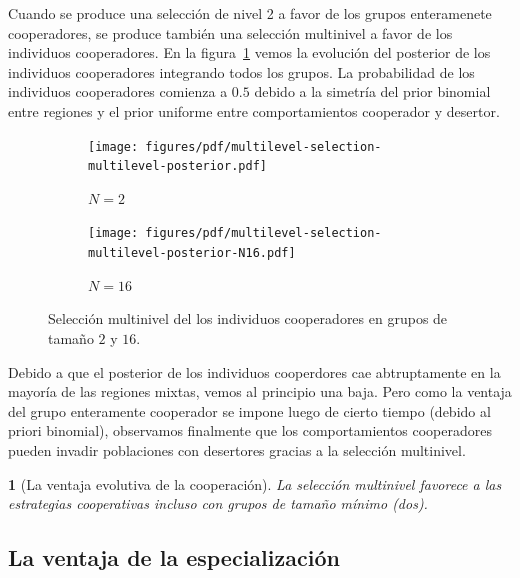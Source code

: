 \documentclass[a4paper,10pt]{article}
\newif\ifen
\newif\ifes
\newcommand{\en}[1]{\ifen#1\fi}
\newcommand{\es}[1]{\ifes#1\fi}
\newcommand{\Aa}{\en{e}\es{a}}
\newtheorem{conclution}{\en{Conclution}\es{Conclusión}}%
\begin{document}

Cuando se produce una selección de nivel 2 a favor de los grupos enteramenete cooperadores, se produce también una selección multinivel a favor de los individuos cooperadores.
%
En la figura~\ref{fig:multilevel-selection-multilevel-posterior} vemos la evolución del posterior de los individuos cooperadores integrando todos los grupos.
%
La probabilidad de los individuos cooperadores comienza a $0.5$ debido a la simetría del prior binomial entre regiones y el prior uniforme entre comportamientos cooperador y desertor.
%
\begin{figure}[ht!]
    \centering
    \begin{subfigure}[b]{0.48\textwidth}
    \texttt{[image: figures/pdf/multilevel-selection-multilevel-posterior.pdf]}
    \caption{$N=2$}
    \end{subfigure}
    \begin{subfigure}[b]{0.48\textwidth}
    \texttt{[image: figures/pdf/multilevel-selection-multilevel-posterior-N16.pdf]}
    \caption{$N=16$}
    \end{subfigure}
    \caption{
    Selección multinivel del los individuos cooperadores en grupos de tamaño $2$ y $16$.
    }
    \label{fig:multilevel-selection-multilevel-posterior}
\end{figure}
%
Debido a que el posterior de los individuos cooperdores cae abtruptamente en la mayoría de las regiones mixtas, vemos al principio una baja.
%
Pero como la ventaja del grupo enteramente cooperador se impone luego de cierto tiempo (debido al priori binomial), observamos finalmente que los comportamientos cooperadores pueden invadir poblaciones con desertores gracias a la selección multinivel.
%
\begin{conclution}[La ventaja evolutiva de la cooperación]
La selección multinivel favorece a las estrategias cooperativas incluso con grupos de tamaño mínimo (dos).
\end{conclution}

\subsection{La ventaja de la especialización}
\end{document}
